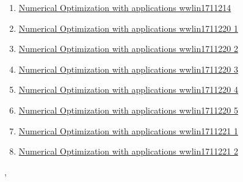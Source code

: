 \documentclass[11pt]{article}
\renewcommand{\today}{\shortmonthname[\the\month] \the \day,  \the\year}
\begin{document}
\begin{enumerate}
	\item \href{https://mp.weixin.qq.com/s/xNBre8NCWLmYhHNAom43Rg}{Numerical Optimization with applications wwlin1711214}	%
	\item \href{https://mp.weixin.qq.com/s/VS6glosQYyureT39B518gg}{Numerical Optimization with applications wwlin1711220 1}	%
	\item \href{https://mp.weixin.qq.com/s/z7DEbGEF2Qbh75JT_HrwfQ}{Numerical Optimization with applications wwlin1711220 2}	%
	\item \href{https://mp.weixin.qq.com/s/YCkb7RzRynMkx4VlWH3Hcg}{Numerical Optimization with applications wwlin1711220 3}	%
	\item \href{https://mp.weixin.qq.com/s/lIsH3yDcJoY4_K3WykUzDA}{Numerical Optimization with applications wwlin1711220 4}	%
	\item \href{https://mp.weixin.qq.com/s/B-C4NDOKgpJwUquHktOiZQ}{Numerical Optimization with applications wwlin1711220 5}	%
	\item \href{https://mp.weixin.qq.com/s/UzJpzoOpm5mXSXKfV_TzDA}{Numerical Optimization with applications wwlin1711221 1}	%
	\item \href{https://mp.weixin.qq.com/s/gY5GtLrgU5q5UC3qn8zp4Q}{Numerical Optimization with applications wwlin1711221 2}	%
\end{enumerate}

%
\begin{flushright}
	\tiny \today 
\end{flushright}
\end{document}
